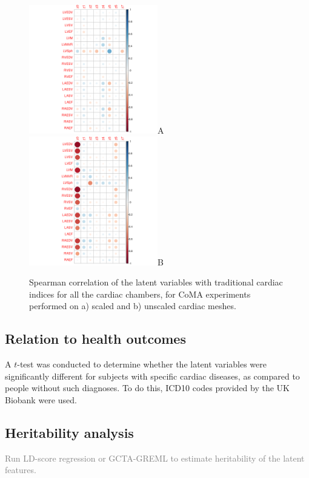\begin{figure}[ht!]
\includegraphics[width=0.5\textwidth]{figs/correlation/experiment_1_vs_cardiac_indices}A
\includegraphics[width=0.5\textwidth]{figs/correlation/experiment_2_vs_cardiac_indices}B
\label{fig:relation_to_indices}
\caption{Spearman correlation of the latent variables with traditional cardiac indices for all the cardiac chambers, for CoMA experiments performed on a) scaled and b) unscaled cardiac meshes.}
\end{figure}

\subsection*{Relation to health outcomes}
A $t$-test was conducted to determine whether the latent variables were significantly different for subjects with specific cardiac diseases, as compared to people without such diagnoses. To do this, ICD10 codes provided by the UK Biobank were used.


\subsection*{Heritability analysis}
\textcolor{gray}{Run LD-score regression or GCTA-GREML to estimate heritability of the latent features.}

